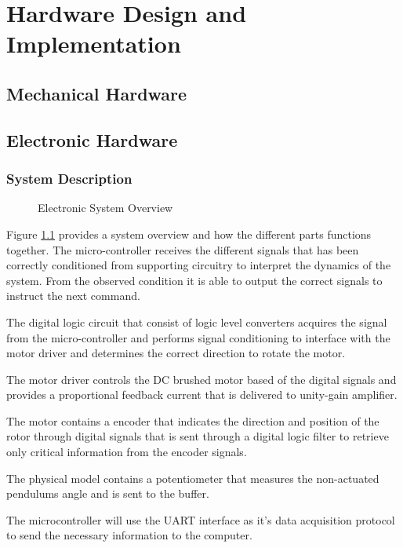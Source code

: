 \chapter{Hardware Design and Implementation}
\section{Mechanical Hardware}




\section{Electronic Hardware}
\subsection{System Description}

\begin{figure}[h]
	\centering
	
	\caption{Electronic System Overview}
	\label{fig:electronicSystemOverview}
\end{figure}


Figure \ref{fig:electronicSystemOverview} provides a system overview and how the different parts functions together. The micro-controller receives the different signals that has been correctly conditioned from supporting circuitry to interpret the dynamics of the system. From the observed condition it is able to output the correct signals to instruct the next command.

The digital logic circuit that consist of logic level converters acquires the signal from the micro-controller and performs signal conditioning to interface with the motor driver and determines the correct direction to rotate the motor. 

The motor driver controls the DC brushed motor based of the digital signals and provides a proportional feedback current that is delivered to unity-gain amplifier.

The motor contains a encoder that indicates the direction and position of the rotor through digital signals that is sent through a digital logic filter to retrieve only critical information from the encoder signals. 

The physical model contains a potentiometer that measures the non-actuated pendulums angle and is sent to the buffer.

The microcontroller will use the UART interface as it's data acquisition protocol to send the necessary information to the computer. 

